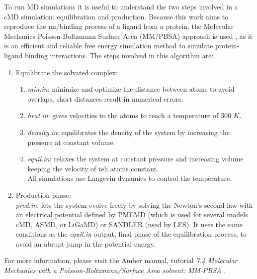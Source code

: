 \documentclass[
  journal=usp, %
  manuscript=final-report,
  year=2023,
  volume=1,
]{cup-journal}
\begin{document}
To run MD simulations it is useful to understand the two steps involved in a cMD simulation: equilibration and production. Because this work aims to reproduce the un/binding process of a ligand from a protein, the Molecular Mechanics Poisson-Boltzmann Surface Area (MM/PBSA) approach is used \cite{MMPBSA}, as it is an efficient and reliable free energy simulation method to simulate protein-ligand binding interactions. The steps involved in this algorithm are:

\begin{enumerate}
    \item Equilibrate the solvated complex:
    \begin{enumerate}%
        \item \textit{min.in}: minimize and optimize the distance between atoms to avoid overlaps, short distances result in numerical errors.
        \item \textit{heat.in}: gives velocities to the atoms to reach a temperature of 300 $K$.
        \item \textit{density.in}: equilibrates the density of the system by increasing the pressure at constant volume.
        \item \textit{equil.in}: relaxes the system at constant pressure and increasing volume keeping the velocity of teh atoms constant.\\
    All simulations use Langevin dynamics to control the temperature.    
    \end{enumerate}
    \item Production phase: \\
    \textit{prod.in}, lets the system evolve freely by solving the Newton's second law with an electrical potential defined by PMEMD (which is used for several models cMD, ASMD, or LiGaMD) or SANDLER (used by LES). It uses the same conditions as the \textit{equil.in} output, final phase of the equilibration process, to avoid an abrupt jump in the potential energy.
\end{enumerate}

For more information, please visit the Amber manual, tutorial \textit{7.4 Molecular Mechanics with a Poisson‐Boltzmann/Surface Area solvent: MM-PBSA} \cite{amber}.

\end{document}
